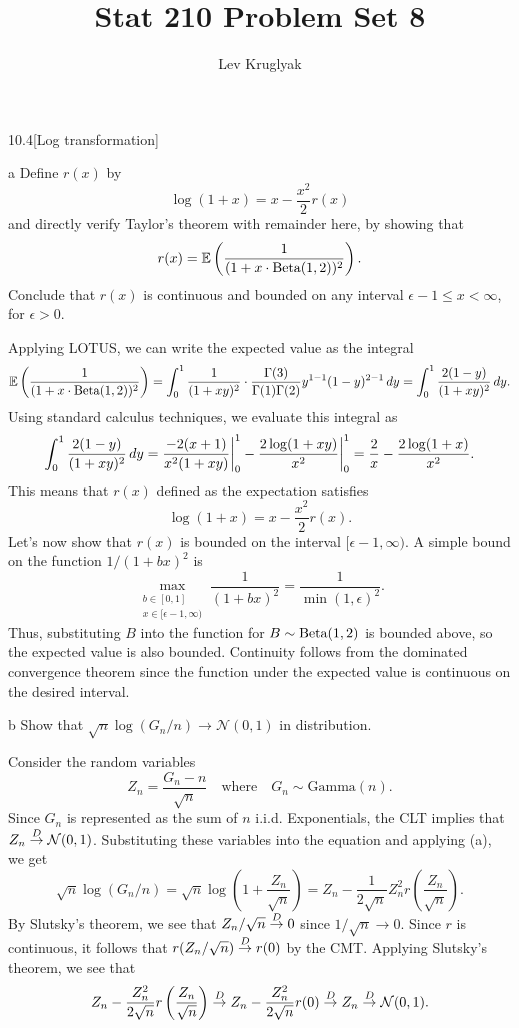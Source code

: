 \documentclass{pset}
\title{Stat 210 Problem Set 8}
\author{Lev Kruglyak}
\begin{document}
\maketitle
\collaborators

\begin{problem}{10.4}[Log transformation]
\end{problem}

\begin{parts}
  \begin{part}{a}
    Define $r(x)$ by
    \[
      \log(1+x) = x - \frac{x^2}{2}r(x)
    \]
    and directly verify Taylor's theorem with remainder here, by showing that
    \[
      r(x) = \mathbb{E}\left(\frac{1}{(1+x\cdot \textrm{Beta}(1,2))^2}\right).
    \]
    Conclude that $r(x)$ is continuous and bounded on any interval $\epsilon - 1 \leq x < \infty$, for $\epsilon > 0$.
  \end{part}

  Applying LOTUS, we can write the expected value as the integral
  \[
    \mathbb{E}\left(\frac{1}{(1+x\cdot\textrm{Beta}(1,2))^2}\right) = \int_0^1 \frac{1}{(1+xy)^2}\cdot \frac{\Gamma(3)}{\Gamma(1)\Gamma(2)}y^{1-1}(1-y)^{2-1}\,dy = \int_0^1 \frac{2(1-y)}{(1+xy)^2}\,dy.
  \]
  Using standard calculus techniques, we evaluate this integral as
  \[
    \int_0^1\frac{2(1-y)}{(1+xy)^2}\,dy = \defint{\frac{-2(x+1)}{x^2(1+xy)}}{0}{1} -\defint{\frac{2\log(1+xy)}{x^2}}{0}{1} = \frac{2}{x}-\frac{2\log(1+x)}{x^2}.
  \]
  This means that $r(x)$ defined as the expectation satisfies
  \[
    \log(1+x)= x-\frac{x^2}{2}r(x).
  \]
  Let's now show that $r(x)$ is bounded on the interval $[\epsilon - 1, \infty)$. A simple bound on the function $1/(1+bx)^2$ is
  \[
    \max_{\substack{b\in [0,1]\\ x\in [\epsilon-1, \infty)}} \frac{1}{(1+bx)^2} = \frac{1}{\min(1,\epsilon)^2}.
  \]
  Thus, substituting $B$ into the function for $B\sim \textrm{Beta}(1,2)$ is bounded above, so the expected value is also bounded. Continuity follows from the dominated convergence theorem since the function under the expected value is continuous on the desired interval.

  \begin{part}{b}
    Show that $\sqrt{n}\log\left(G_n/n\right) \to \mathcal{N}(0,1)$ in distribution.
  \end{part}

  Consider the random variables 
  \[
    Z_n = \frac{G_n - n}{\sqrt{n}} \quad\textrm{where}\quad G_n\sim \textrm{Gamma}(n).
  \]
  Since $G_n$ is represented as the sum of $n$ i.i.d. Exponentials, the CLT implies that $Z_n \toD \N(0,1)$. Substituting these variables into the equation and applying (a), we get
  \[
    \sqrt{n} \log(G_n/n) = \sqrt{n}\log\left(1+ \frac{Z_n}{\sqrt{n}}\right) = Z_n - \frac{1}{2\sqrt{n}} Z_n^2 r\left(\frac{Z_n}{\sqrt{n}}\right).
  \]
  By Slutsky's theorem, we see that $Z_n/\sqrt{n}\toD 0$ since $1/\sqrt{n} \to 0$. Since $r$ is continuous, it follows that $r(Z_n/\sqrt{n})\toD r(0)$ by the CMT. Applying Slutsky's theorem, we see that
  \[
    Z_n - \frac{Z_n^2}{2\sqrt{n}}r\left(\frac{Z_n}{\sqrt{n}}\right) \toD Z_n - \frac{Z_n^2}{2\sqrt{n}}r(0) \toD  Z_n \toD \mathcal{N}(0,1).
  \]



\end{parts}
\end{document}
